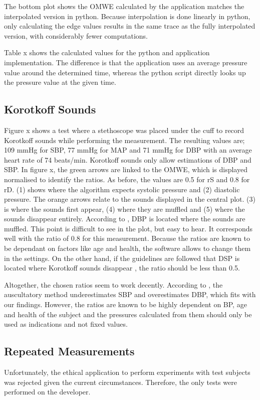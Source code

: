 The bottom plot shows the OMWE calculated by the application matches the interpolated version in python. Because interpolation is done linearly in python, only calculating the edge values results in the same trace as the fully interpolated version, with considerably fewer computations.

Table x shows the calculated values for the python and application implementation. The difference is that the application uses an average pressure value around the determined time, whereas the python script directly looks up the pressure value at the given time. 


\subsection{Korotkoff Sounds}

Figure x shows a test where a stethoscope was placed under the cuff to record Korotkoff sounds while performing the measurement. The resulting values are; 109 mmHg for SBP, 77 mmHg for MAP and 71 mmHg for DBP with an average heart rate of 74 beats/min. Korotkoff sounds only allow estimations of DBP and SBP. In figure x, the green arrows are linked to the OMWE, which is displayed normalised to identify the ratios. As before, the values are 0.5 for rS and 0.8 for rD. (1) shows where the algorithm expects systolic pressure and (2) diastolic pressure. The orange arrows relate to the sounds displayed in the central plot. (3) is where the sounds first appear, (4) where they are muffled and (5) where the sounds disappear entirely. According to \citet{Boron2012}, DBP is located where the sounds are muffled. This point is difficult to see in the plot, but easy to hear. It corresponds well with the ratio of 0.8 for this measurement.
Because the ratios are known to be dependant on factors like age and health, the software allows to change them in the settings.  On the other hand, if the guidelines are followed that DSP is located where Korotkoff sounds disappear \citep{Lloyd2018,Reeves1995}, the ratio should be less than 0.5. 

Altogether, the chosen ratios seem to work decently. According to \citet{Sapinski1996}, the auscultatory method underestimates SBP and overestimates DBP, which fits with our findings. However, the ratios are known to be highly dependent on BP, age and health of the subject and the pressures calculated from them should only be used as indications and not fixed values. 

\subsection{Repeated Measurements}
Unfortunately, the ethical application to perform experiments with test subjects was rejected given the current circumstances. Therefore, the only tests were performed on the developer. 

